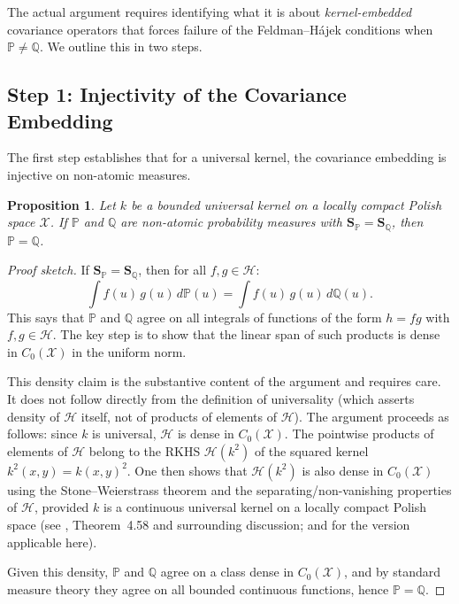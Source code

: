 \documentclass[12pt, oneside]{book}
\theoremstyle{plain}
\newtheorem{proposition}[theorem]{Proposition}
\theoremstyle{definition}
\newcommand{\calH}{\mathcal{H}}
\newcommand{\calX}{\mathcal{X}}
\newcommand{\PP}{\mathbb{P}}
\newcommand{\QQ}{\mathbb{Q}}
\newcommand{\SP}{\mathbf{S}_{\PP}}
\newcommand{\SQ}{\mathbf{S}_{\QQ}}
\begin{document}
The actual argument requires identifying what it is about \emph{kernel-embedded} covariance operators that forces failure of the Feldman--H\'ajek conditions when $\PP \neq \QQ$. We outline this in two steps.

\subsection{Step 1: Injectivity of the Covariance Embedding}

The first step establishes that for a universal kernel, the covariance embedding is injective on non-atomic measures.

\begin{proposition}
\label{prop:injective}
Let $k$ be a bounded universal kernel on a locally compact Polish space $\calX$. If $\PP$ and $\QQ$ are non-atomic probability measures with $\SP = \SQ$, then $\PP = \QQ$.
\end{proposition}

\begin{proof}[Proof sketch]
If $\SP = \SQ$, then for all $f, g \in \calH$:
\begin{equation}
\int f(u)\, g(u)\, d\PP(u) = \int f(u)\, g(u)\, d\QQ(u).
\end{equation}
This says that $\PP$ and $\QQ$ agree on all integrals of functions of the form $h = fg$ with $f, g \in \calH$. The key step is to show that the linear span of such products is dense in $C_0(\calX)$ in the uniform norm.

This density claim is the substantive content of the argument and requires care. It does not follow directly from the definition of universality (which asserts density of $\calH$ itself, not of products of elements of $\calH$). The argument proceeds as follows: since $k$ is universal, $\calH$ is dense in $C_0(\calX)$. The pointwise products of elements of $\calH$ belong to the RKHS $\calH(k^2)$ of the squared kernel $k^2(x,y) = k(x,y)^2$. One then shows that $\calH(k^2)$ is also dense in $C_0(\calX)$ using the Stone--Weierstrass theorem and the separating/non-vanishing properties of $\calH$, provided $k$ is a continuous universal kernel on a locally compact Polish space (see \cite{SteinwartChristmann2008}, Theorem~4.58 and surrounding discussion; and \cite{SantoroPNAS2026} for the version applicable here).

Given this density, $\PP$ and $\QQ$ agree on a class dense in $C_0(\calX)$, and by standard measure theory they agree on all bounded continuous functions, hence $\PP = \QQ$.
\end{proof}
\end{document}
